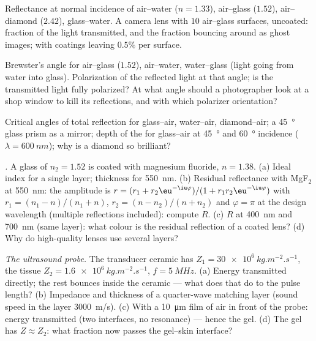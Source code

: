 \begin{exercise}[$\star$]\label{exo:b2:wave-interfaces:2}
Reflectance at normal incidence of air--water ($n = 1.33$), air--glass
($1.52$), air--diamond ($2.42$), glass--water. A camera lens with $10$
air--glass surfaces, uncoated: fraction of the light transmitted, and
the fraction bouncing around as ghost images; with coatings leaving
$0.5\%$ per surface.
\end{exercise}

\begin{exercise}[$\star$]\label{exo:b2:wave-interfaces:3}
Brewster's angle for air--glass ($1.52$), air--water, water--glass
(light going from water into glass). Polarization of the reflected
light at that angle; is the transmitted light fully polarized? At what
angle should a photographer look at a shop window to kill its
reflections, and with which polarizer orientation?
\end{exercise}

\begin{exercise}[$\star$]\label{exo:b2:wave-interfaces:4}
Critical angles of total reflection for glass--air, water--air,
diamond--air; a \qty{45}{\degree} glass prism as a mirror; depth of the
 for glass--air at \qty{45}{\degree} and \qty{60}{\degree}
incidence ($\lambda = \qty{600}{nm}$); why is a diamond so brilliant?
\end{exercise}

\begin{exercise}[$\star\star$]\label{exo:b2:wave-interfaces:5}
\emph{.} A glass of $n_2 = 1.52$ is coated with
magnesium fluoride, $n = 1.38$. (a) Ideal index for a single layer;
thickness for \qty{550}{nm}. (b) Residual reflectance with MgF$_2$ at
\qty{550}{nm}: the amplitude is $r = (r_1 + r_2\eu^{-\iu\varphi})/(1 + r_1r_2
\eu^{-\iu\varphi})$ with $r_1 = (n_1 - n)/(n_1 + n)$, $r_2 = (n - n_2)/(n + n_2)$
and $\varphi = \pi$ at the design wavelength (multiple reflections
included): compute $R$. (c) $R$ at \qty{400}{nm} and \qty{700}{nm} (same
layer): what colour is the residual reflection of a coated lens?
(d) Why do high-quality lenses use several layers?
\end{exercise}

\begin{exercise}[$\star\star$]\label{exo:b2:wave-interfaces:6}
\emph{The ultrasound probe.} The transducer ceramic has $Z_1 = \qty{30e6}{kg.m^{-2}.s^{-1}}$,
the tissue $Z_2 = \qty{1.6e6}{kg.m^{-2}.s^{-1}}$, $f = \qty{5}{MHz}$. (a) Energy
transmitted directly; the rest bounces inside the ceramic --- what
does that do to the pulse length? (b) Impedance and thickness of a
quarter-wave matching layer (sound speed in the layer \qty{3000}{m/s}).
(c) With a \qty{10}{\micro m} film of air in front of the probe: energy
transmitted (two interfaces, no resonance) --- hence the gel. (d) The
gel has $Z \approx Z_2$: what fraction now passes the gel--skin interface?
\end{exercise}

